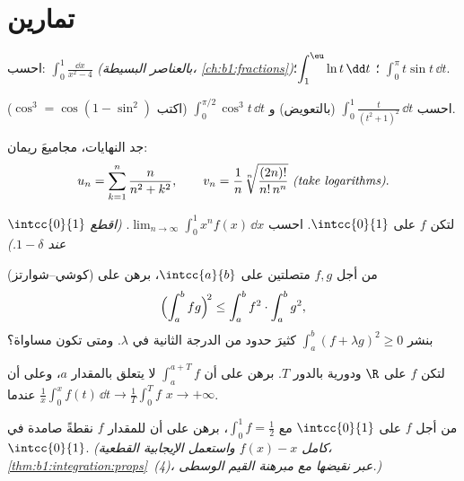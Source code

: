 \section{تمارين}

\begin{exercise}[$\star$]\label{exo:b1:integration:1}
احسب: $\displaystyle\int_0^1 \frac{\dd x}{x^2 - 4}$
\emph{(بالعناصر البسيطة، \cref{ch:b1:fractions})}؛
$\displaystyle\int_1^{\eu} \ln t \,\dd t$؛
$\displaystyle\int_0^{\pi} t \sin t\, \dd t$.
\end{exercise}

\begin{exercise}[$\star$]\label{exo:b1:integration:2}
احسب $\displaystyle\int_0^{1} \frac{t}{(t^2+1)^2}\,\dd t$
(بالتعويض) و
$\displaystyle\int_0^{\pi/2} \cos^3 t\, \dd t$ (اكتب $\cos^3 =
\cos(1 - \sin^2)$).
\end{exercise}

\begin{exercise}[$\star$]\label{exo:b1:integration:3}
جد النهايات، مجاميعَ ريمان:
\[
u_n = \sum_{k=1}^{n} \frac{n}{n^2 + k^2},
\qquad
v_n = \frac{1}{n}\sqrt[n]{\frac{(2n)!}{n!\,n^n}}
\ \emph{(take logarithms)}.
\]
\end{exercise}

\begin{exercise}[$\star$]\label{exo:b1:integration:4}
لتكن $f$  على $\intcc{0}{1}$. احسب $\lim_{n\to\infty}
\int_0^1 x^n f(x)\,\dd x$. \emph{(اقطع $\intcc{0}{1}$ عند $1 -
\delta$.)}
\end{exercise}

\begin{exercise}[$\star\star$]\label{exo:b1:integration:5}
(كوشي--شوارتز) من أجل $f, g$ متصلتين على $\intcc{a}{b}$، برهن على
\[
\Bigl(\int_a^b fg\Bigr)^{\!2} \leq \int_a^b f^2 \cdot \int_a^b g^2 ,
\]
بنشر $\int_a^b (f + \lambda g)^2 \geq 0$ كثيرَ حدود من الدرجة الثانية في
$\lambda$. ومتى تكون مساواة؟
\end{exercise}

\begin{exercise}[$\star\star$]\label{exo:b1:integration:6}
لتكن $f$  على $\R$ ودورية بالدور $T$. برهن على أن $\int_a^{a+T}
f$ لا يتعلق بالمقدار $a$، وعلى أن $\frac1x \int_0^x f(t)\,\dd t
\to \frac 1T \int_0^T f$ عندما $x \to +\infty$.
\end{exercise}

\begin{exercise}[$\star\star$]\label{exo:b1:integration:7}
من أجل $f$  على $\intcc{0}{1}$ مع $\int_0^1 f = \frac12$،
برهن على أن للمقدار $f$ نقطةً صامدة في $\intcc{0}{1}$. \emph{(كامل
$f(x) - x$ واستعمل الإيجابية القطعية،
\cref{thm:b1:integration:props}~(4)، عبر نقيضها
مع مبرهنة القيم الوسطى.)}
\end{exercise}

